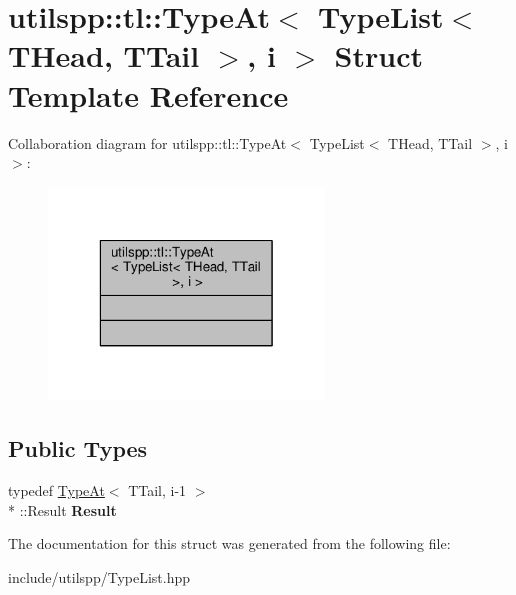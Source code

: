 \hypertarget{structutilspp_1_1tl_1_1TypeAt_3_01TypeList_3_01THead_00_01TTail_01_4_00_01i_01_4}{\section{utilspp\-:\-:tl\-:\-:Type\-At$<$ Type\-List$<$ T\-Head, T\-Tail $>$, i $>$ Struct Template Reference}
\label{structutilspp_1_1tl_1_1TypeAt_3_01TypeList_3_01THead_00_01TTail_01_4_00_01i_01_4}
}


Collaboration diagram for utilspp\-:\-:tl\-:\-:Type\-At$<$ Type\-List$<$ T\-Head, T\-Tail $>$, i $>$\-:\nopagebreak
\begin{figure}[H]
\begin{center}
\leavevmode
\includegraphics[width=208pt]{structutilspp_1_1tl_1_1TypeAt_3_01TypeList_3_01THead_00_01TTail_01_4_00_01i_01_4__coll__graph}
\end{center}
\end{figure}
\subsection*{Public Types}
\begin{DoxyCompactItemize}
\item 
\hypertarget{structutilspp_1_1tl_1_1TypeAt_3_01TypeList_3_01THead_00_01TTail_01_4_00_01i_01_4_a813350563ebfa43ebd14c38df3fa1e1f}{typedef \hyperlink{structutilspp_1_1tl_1_1TypeAt}{Type\-At}$<$ T\-Tail, i-\/1 $>$\\*
\-::Result {\bfseries Result}}\label{structutilspp_1_1tl_1_1TypeAt_3_01TypeList_3_01THead_00_01TTail_01_4_00_01i_01_4_a813350563ebfa43ebd14c38df3fa1e1f}

\end{DoxyCompactItemize}


The documentation for this struct was generated from the following file\-:\begin{DoxyCompactItemize}
\item 
include/utilspp/Type\-List.\-hpp\end{DoxyCompactItemize}
